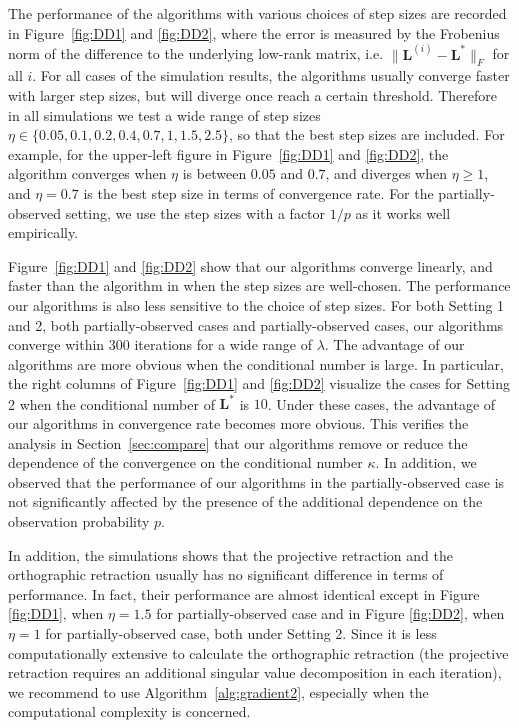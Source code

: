 \documentclass[12pt]{article}
\newcommand{\bL}{\boldsymbol{L}}
\theoremstyle{plain}
\theoremstyle{definition}
\theoremstyle{plain}
\theoremstyle{plain}
\theoremstyle{remark}
\begin{document}
The performance of the algorithms with various choices of step sizes are recorded in Figure~\ref{fig:DD1} and \ref{fig:DD2}, where the error is measured by the Frobenius norm of the difference to the underlying low-rank matrix, i.e. $\|\bL^{(i)}-\bL^*\|_F$ for all $i$. For all cases of the simulation results, the algorithms usually converge faster with larger step sizes, but will diverge once reach a certain threshold. Therefore in all simulations we test a wide range of step sizes $\eta \in \{0.05,0.1,0.2,0.4,0.7,1,1.5,2.5\}$, so that the best step sizes are included. For example, for the upper-left figure in Figure~\ref{fig:DD1} and \ref{fig:DD2}, the algorithm converges when $\eta$ is between $0.05$ and $0.7$, and diverges when $\eta\geq 1$, and $\eta=0.7$ is the best step size in terms of convergence rate. For the partially-observed setting, we use the step sizes with a factor $1/p$ as it works well empirically. 

Figure~\ref{fig:DD1} and \ref{fig:DD2} show that our algorithms converge linearly, and faster than the algorithm in \cite{DBLP:conf/nips/YiPCC16} when the step sizes are well-chosen.  The performance our algorithms is also less sensitive to the choice of step sizes. For both Setting 1 and 2, both partially-observed cases and partially-observed cases, our algorithms converge within $300$ iterations for a wide range of $\lambda$.  The advantage of our algorithms are more obvious when the conditional number is large. In particular, the right columns of Figure~\ref{fig:DD1} and \ref{fig:DD2} visualize the cases for Setting 2 when the conditional number of $\bL^*$ is $10$. Under these cases, the advantage of our algorithms in convergence rate becomes more obvious. This verifies the analysis in Section~\ref{sec:compare} that our algorithms remove or reduce the dependence of the convergence on the conditional number $\kappa$. In addition, we observed that the performance of our algorithms in the partially-observed case is not significantly affected by the presence of the additional dependence on the observation probability $p$.

In addition, the simulations shows that the projective retraction and the orthographic retraction usually has no significant difference in terms of performance. In fact, their performance are almost identical except in Figure \ref{fig:DD1}, when $\eta=1.5$ for partially-observed case and in Figure \ref{fig:DD2}, when $\eta=1$ for partially-observed case, both under Setting 2. Since it is less computationally extensive to calculate the orthographic retraction (the projective retraction requires an additional singular value decomposition in each iteration), we recommend to use Algorithm~\ref{alg:gradient2}, especially when the computational complexity is concerned.
\end{document}
